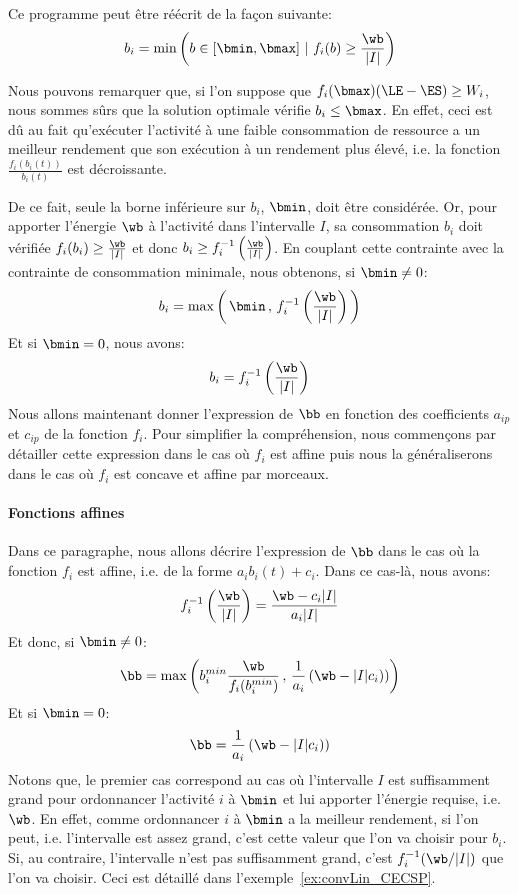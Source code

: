Ce programme peut être réécrit de la façon suivante: 
\[ b_i=\min\left( b \in [\bmin,\bmax]\ |\ f_i(b) \ge
    \frac{\wb}{|I|}\right)
\]

Nous pouvons remarquer que, si l'on suppose que $f_i(\bmax) (\LE - \ES
) \ge W_i$, nous sommes sûrs que la solution optimale vérifie $b_i \le
\bmax$. En effet, ceci est dû au fait qu'exécuter l'activité à une
faible consommation de ressource a un meilleur rendement que son
exécution à un rendement plus élevé, i.e. la fonction
$\frac{f_i(b_i(t))}{b_i(t)}$ est décroissante. 

De ce fait, seule la borne inférieure sur $b_i$, $\bmin$, doit être
considérée. Or, pour apporter l'énergie $\wb$ à l'activité dans
l'intervalle $I$, sa consommation $b_i$ doit vérifiée $f_i(b_i) \ge
\frac{\wb}{|I|}$ et donc $b_i \ge
f_i^{-1}\left(\frac{\wb}{|I|}\right)$. En couplant cette contrainte
avec la contrainte de consommation minimale, nous obtenons, si $\bmin
\neq 0$:
\[
  b_i= \max\left(\, \bmin \, ,\, 
    f_i^{-1}\left(\frac{\wb}{|I|}\right)\, \right)
\]
Et si $\bmin = 0$, nous avons:
\[
  b_i=  f_i^{-1}\left(\frac{\wb}{|I|}\right)
\]
Nous allons maintenant donner l'expression de $\bb$  en fonction des
coefficients $a_{ip}$  et $c_{ip}$ de la fonction $f_i$. Pour
simplifier la compréhension, nous commençons par détailler cette
expression dans le cas où $f_i$ est affine puis nous la généraliserons
dans le cas où $f_i$ est concave et affine par morceaux. 

\paragraph{Fonctions affines}

Dans ce paragraphe, nous allons décrire l'expression de $\bb$ dans le
cas où la fonction $f_i$ est affine, i.e. de la forme $a_ib_i(t)+c_i$. Dans
ce cas-là, nous avons:  
\[f_i^{-1}\left( \frac{\wb}{|I|}\right)= \frac{ \wb- c_i|I|}{a_i|I|}
\]
Et donc, si $\bmin\neq 0$: 
\begin{equation}
  \bb= \max\left(b_i^{min} \frac{\wb}{f_i(b_i^{min})} \, ,\,  
    \frac{1}{a_i}\left(\wb-|I|c_{i})\right)\right)
\end{equation}
Et si $\bmin=0$: 
\[
  \bb=  \frac{1}{a_i}\left(\wb-|I|c_{i})\right)
\]
Notons que, le premier cas correspond au cas où l'intervalle $I$ est
suffisamment grand pour ordonnancer l'activité $i$ à $\bmin$ et lui
apporter l'énergie requise, i.e. $\wb$. En effet, comme ordonnancer
$i$ à $\bmin$ a la meilleur rendement, si l'on peut, i.e. l'intervalle
est assez grand, c'est cette valeur que l'on va choisir pour
$b_i$. Si, au contraire, l'intervalle n'est pas suffisamment grand,
c'est $f_i^{-1}(\wb/|I|) $ que l'on va choisir. Ceci est
détaillé dans l'exemple~\ref{ex:convLin_CECSP}.

